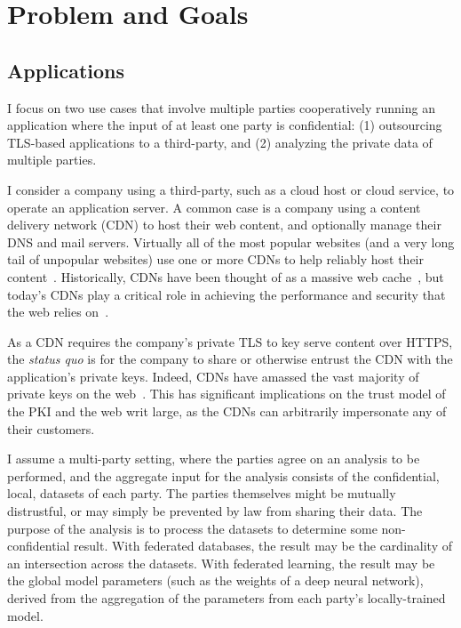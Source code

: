 \section{Problem and Goals}
\label{sec:background}

\subsection{Applications}

I focus on two use cases that involve multiple parties cooperatively running
an application where the input of at least one party is confidential:
(1) outsourcing TLS-based applications to a third-party, and (2)
analyzing the private data of multiple parties.


%
I consider a company using a third-party, such as a cloud host or cloud
service, to operate an application server.
%
A common case is a company using a content delivery network (CDN) to
host their web content, and optionally manage their DNS and mail servers.
%
Virtually all of the most popular websites (and a very long tail
of unpopular websites) use one or more CDNs to help reliably host
their content~\cite{key-sharing}. 
%
Historically, CDNs have been thought of as a massive web
cache~\cite{cdn-on-demand}, but today’s CDNs play a critical role in achieving
the performance and security that the web relies on~\cite{securing-cdns}.



As a CDN requires the company's private TLS to key serve content over HTTPS,
the \emph{status quo} is for the company to share or otherwise entrust the CDN
with the application's private keys.
%
Indeed, CDNs have amassed the vast majority of private keys on the
web~\cite{key-sharing,when-https-meets-cdn}.
%
This has significant implications on the trust model of the PKI and the web
writ large, as the CDNs  can arbitrarily impersonate any of their customers.


%
I assume a multi-party setting, where the parties agree on an analysis to be
performed, and the aggregate input for the analysis consists of the
confidential, local, datasets of each party.
% 
The parties themselves might be mutually distrustful, or may simply be
prevented by law from sharing their data.
%
The purpose of the analysis is to process the datasets to determine some
non-confidential result.
%
With federated databases, the result may be the cardinality of an intersection
across the datasets.
%
With federated learning, the result may be the global model parameters (such
as the weights of a deep neural network), derived from the aggregation of the
parameters from each party's locally-trained model.



